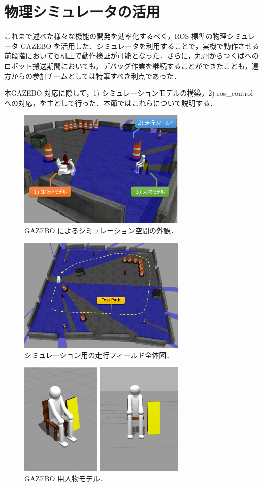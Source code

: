 \documentclass[10pt,a4paper]{jarticle}
\begin{document}
\section{物理シミュレータの活用}
\label{sec:simulation}

これまで述べた様々な機能の開発を効率化するべく，ROS 標準の物理シミュレータ GAZEBO \cite{gazebo} を活用した．シミュレータを利用することで，実機で動作させる前段階においても机上で動作検証が可能となった．さらに，九州からつくばへのロボット搬送期間においても，デバッグ作業を継続することができたことも，遠方からの参加チームとしては特筆すべき利点であった．

本GAZEBO 対応に際して，1) シミュレーションモデルの構築，2) ros\_control への対応，を主として行った．本節ではこれらについて説明する．

\begin{figure}[ht]
    \centering
    \includegraphics[width=8cm]{./fig/png/simulation_summary.png}
    \caption{GAZEBO によるシミュレーション空間の外観．}
    \label{simulation_summary}
\end{figure}

\begin{figure}[ht]
    \centering
    \includegraphics[width=8cm]{./fig/png/simulation_field.png}
    \caption{シミュレーション用の走行フィールド全体図．}
    \label{simulation_field}
\end{figure}

\begin{figure}[ht]
    \centering
    \includegraphics[width=8cm]{./fig/png/human_model.png}
    \caption{GAZEBO 用人物モデル．}
    \label{human_model}
\end{figure}
\end{document}
